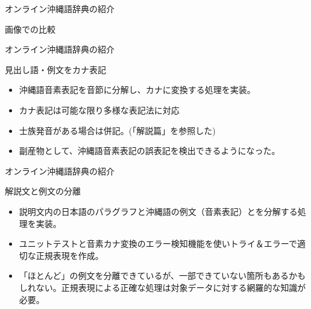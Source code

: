 \documentclass[14pt]{beamer}
\begin{document}
\begin{frame}{オンライン沖縄語辞典の紹介}
\begin{block}{画像での比較}
\begin{figure}[ht]
\begin{minipage}{0.5\textwidth}
      \end{minipage}
    \end{figure}
  \end{block}
\end{frame}

\begin{frame}{オンライン沖縄語辞典の紹介}
  \begin{block}{見出し語・例文をカナ表記}
    \begin{itemize}
    \item 沖縄語音素表記を音節に分解し、カナに変換する処理を実装。
    \item カナ表記は可能な限り多様な表記法に対応
    \item 士族発音がある場合は併記。(「解説篇」を参照した)
    \item 副産物として、沖縄語音素表記の誤表記を検出できるようになった。
    \end{itemize}
  \end{block}
\end{frame}
\begin{frame}{オンライン沖縄語辞典の紹介}
  \begin{block}{解説文と例文の分離}
    \begin{itemize}
    \item 説明文内の日本語のパラグラフと沖縄語の例文（音素表記）とを分解する処理を実装。
    \item ユニットテストと音素カナ変換のエラー検知機能を使いトライ＆エラーで適切な正規表現を作成。
    \item 「ほとんど」の例文を分離できているが、一部できていない箇所もあるかもしれない。正規表現による正確な処理は対象データに対する網羅的な知識が必要。
    \end{itemize}
  \end{block}
\end{frame}
\end{document}
